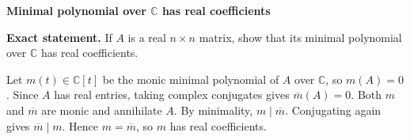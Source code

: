 \begin{problem}[CP-I-0054]
\label{prob:cp-i-0054}
\textbf{Minimal polynomial over $\mathbb C$ has real coefficients}

\textbf{Exact statement.}
\hspace*{1.5em}If $A$ is a real $n\times n$ matrix, show that its minimal polynomial over $\mathbb C$ has real coefficients.

\end{problem}

\begin{solution}
Let $m(t)\in\mathbb C[t]$ be the monic minimal polynomial of $A$ over $\mathbb C$, so $m(A)=0$.
Since $A$ has real entries, taking complex conjugates gives $\overline{m}(A)=0$.
Both $m$ and $\overline{m}$ are monic and annihilate $A$. By minimality, $m\mid \overline{m}$.
Conjugating again gives $\overline{m}\mid m$. Hence $m=\overline{m}$, so $m$ has real coefficients.
\end{solution}

